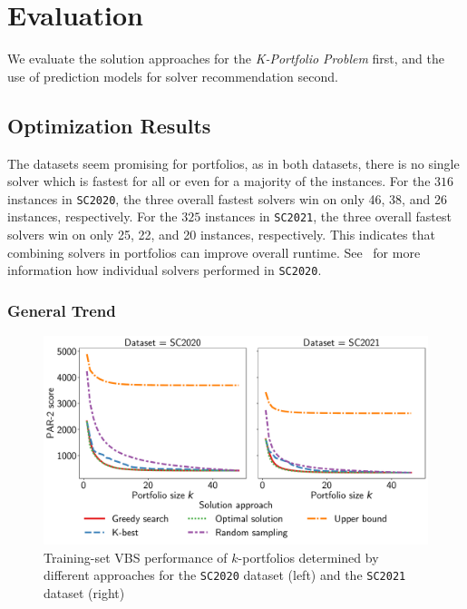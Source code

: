 \documentclass[a4paper,USenglish,pdfa]{lipics-v2021} %
\begin{document}
\section{Evaluation}
\label{sec:evaluation}

We evaluate the solution approaches for the \emph{K-Portfolio Problem} first, and the use of prediction models for solver recommendation second.

\subsection{Optimization Results}

The datasets seem promising for portfolios, as in both datasets, there is no single solver which is fastest for all or even for a majority of the instances.
For the $316$ instances in \texttt{SC2020}, the three overall fastest solvers win on only 46, 38, and 26 instances, respectively.
For the $325$ instances in \texttt{SC2021}, the three overall fastest solvers win on only 25, 22, and 20 instances, respectively.
This indicates that combining solvers in portfolios can improve overall runtime.
See~\cite{SC2020:AIJ} for more information how individual solvers performed in \texttt{SC2020}.

\subsubsection{General Trend}

\begin{figure}[htb]
	\centering
	\includegraphics[width=\columnwidth]{plots/search-train-objective.pdf}
	\caption{Training-set VBS performance of $k$-portfolios determined by different approaches for the \texttt{SC2020} dataset (left) and the \texttt{SC2021} dataset (right)}
	\label{fig:search-train-objective}
\end{figure}
\end{document}
